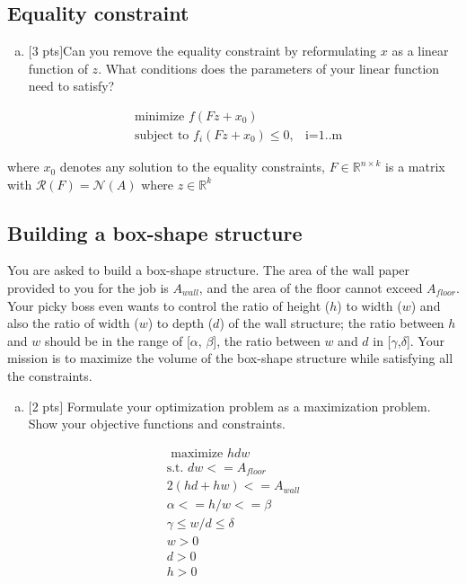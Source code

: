 \documentclass[12pt]{article}
\begin{document}
\vspace{.25cm}

\subsection{Equality constraint}

\begin{enumerate}[(a)]
\item 
$[$3 pts$]$Can you remove the equality constraint by reformulating $x$ as a linear function of $z$. What conditions does the parameters of your linear function need to satisfy?
\end{enumerate}

\begin{eqnarray*}
&\text{minimize   } f(Fz+x_0)\\
&\text{subject to   } f_i(Fz+x_0) \leq 0, & \text{i=1..m}
\end{eqnarray*}

where $x_0$ denotes any solution to the equality constraints, $F \in \mathbb{R}^{n\times k }$ is a matrix with $\mathcal{R}(F) = \mathcal{N}(A)$ where $z \in \mathbb{R}^k$

\vspace{.25cm}

\subsection{Building a box-shape structure}
You are asked to build a box-shape structure. The area of the wall paper provided to you for the job is $A_{wall}$, and the area of the floor cannot exceed $A_{floor}$. Your picky boss even wants to control the ratio of height ($h$) to width ($w$) and also the ratio of width ($w$) to depth ($d$) of the wall structure; the ratio between $h$ and $w$ should be in the range of [$\alpha$, $\beta$], the ratio between $w$ and $d$ in [$\gamma$,$\delta$]. Your mission is to maximize the volume of the box-shape structure while satisfying all the constraints. 
\begin{enumerate}[(a)]
\item $[$2 pts$]$ Formulate your optimization problem as a maximization problem. Show your objective functions and constraints.
\end{enumerate}

\begin{align*}
\text{ maximize } hdw \\
\text{s.t. } dw <= A_{floor} \\
2(hd +hw) <= A_{wall} \\
\alpha <= h/w <= \beta \\
\gamma \leq w/d \leq \delta \\
w>0 \\
d>0 \\
h>0  \\
\end{align*}
\vspace{.25cm}
\end{document}
